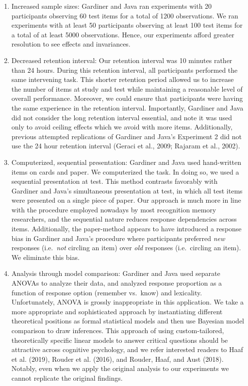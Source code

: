 \documentclass[english,,man,floatsintext]{apa6}
\begin{document}
\begin{enumerate}
\def\labelenumi{\arabic{enumi}.}
\item
  Increased sample sizes: Gardiner and Java ran experiments with 20 participants observing 60 test items for a total of 1200 observations. We ran experiments with at least 50 participants observing at least 100 test items for a total of at least 5000 observations. Hence, our experiments afford greater resolution to see effects and invariances.
\item
  Decreased retention interval: Our retention interval was 10 minutes rather than 24 hours. During this retention interval, all participants performed the same intervening task.
  This shorter retention period allowed us to increase the number of items at study and test while maintaining a reasonable level of overall performance. Moreover, we could ensure that participants were having the same experience in the retention interval.
  Importantly, Gardiner and Java did not consider the long retention interval essential, and note it was used only to avoid ceiling effects which we avoid with more items. Additionally, previous attempted replications of Gardiner and Java's Experiment 2 did not use the 24 hour retention interval (Geraci et al., 2009; Rajaram et al., 2002).
\item
  Computerized, sequential presentation: Gardiner and Java used hand-written items on cards and paper. We computerized the task. In doing so, we used a sequential presentation at test.
  This method contrasts favorably with Gardiner and Java's simultaneous presentation at test, in which all test items were presented on a single piece of paper.
  Our approach is much more in line with the procedure employed nowadays by most recognition memory researchers, and the sequential nature reduces response dependencies across items. Additionally, the paper-method appears to have introduced a response bias in Gardiner and Java's procedure where participants preferred \emph{new} responses (i.e.~\emph{not} circling an item) over \emph{old} responses (i.e.~circling an item).
  We eliminate this bias.
\item
  Analysis through model comparison: Gardiner and Java used separate ANOVAs to analyze their data, and analyzed response proportion as a function of response option (remember vs.~know) and lexicality. Unfortunately, ANOVA is grossly inappropriate in this application.
  We take a more appropriate and sophisticated approach by instantiating different theoretical positions as formal statistical models and then use Bayesian model comparison to draw inferences. This approach of using custom-tailored, theoretically specific linear models to answer critical questions should be attractive across cognitive psychology, and we refer interested readers to Haaf et al. (2019), Rouder et al. (2016), and Rouder, Haaf, and Aust (2018). Notably, even when we apply the original analysis to our experiments we cannot replicate the original findings.
\end{enumerate}
\end{document}
